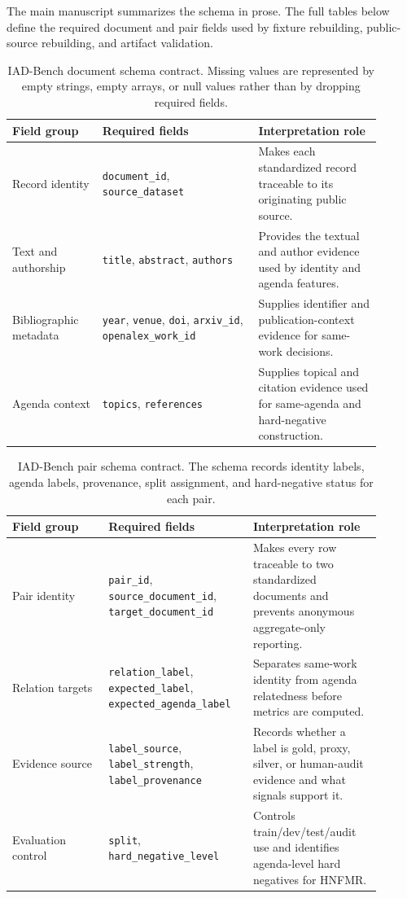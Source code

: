 \documentclass[11pt]{article}
\begin{document}
The main manuscript summarizes the schema in prose. The full tables below define the required document and pair fields used by fixture rebuilding, public-source rebuilding, and artifact validation.

\begin{table}[H]
\caption{IAD-Bench document schema contract. Missing values are represented by empty strings, empty arrays, or null values rather than by dropping required fields.}
\label{tab:iad-bench-document-schema}
\centering
\footnotesize
\setlength{\tabcolsep}{3pt}
\begin{tabular}{L{0.22\linewidth}L{0.38\linewidth}L{0.30\linewidth}}
\toprule
Field group & Required fields & Interpretation role \\
\midrule
Record identity & \texttt{document\_id}, \texttt{source\_dataset} & Makes each standardized record traceable to its originating public source. \\
Text and authorship & \texttt{title}, \texttt{abstract}, \texttt{authors} & Provides the textual and author evidence used by identity and agenda features. \\
Bibliographic metadata & \texttt{year}, \texttt{venue}, \texttt{doi}, \texttt{arxiv\_id}, \texttt{openalex\_work\_id} & Supplies identifier and publication-context evidence for same-work decisions. \\
Agenda context & \texttt{topics}, \texttt{references} & Supplies topical and citation evidence used for same-agenda and hard-negative construction. \\
\bottomrule
\end{tabular}
\end{table}

\begin{table}[H]
\caption{IAD-Bench pair schema contract. The schema records identity labels, agenda labels, provenance, split assignment, and hard-negative status for each pair.}
\label{tab:iad-bench-pair-schema}
\centering
\footnotesize
\setlength{\tabcolsep}{3pt}
\begin{tabular}{L{0.24\linewidth}L{0.34\linewidth}L{0.32\linewidth}}
\toprule
Field group & Required fields & Interpretation role \\
\midrule
Pair identity & \texttt{pair\_id}, \texttt{source\_document\_id}, \texttt{target\_document\_id} & Makes every row traceable to two standardized documents and prevents anonymous aggregate-only reporting. \\
Relation targets & \texttt{relation\_label}, \texttt{expected\_label}, \texttt{expected\_agenda\_label} & Separates same-work identity from agenda relatedness before metrics are computed. \\
Evidence source & \texttt{label\_source}, \texttt{label\_strength}, \texttt{label\_provenance} & Records whether a label is gold, proxy, silver, or human-audit evidence and what signals support it. \\
Evaluation control & \texttt{split}, \texttt{hard\_negative\_level} & Controls train/dev/test/audit use and identifies agenda-level hard negatives for HNFMR. \\
\bottomrule
\end{tabular}
\end{table}
\end{document}
